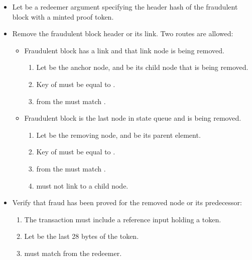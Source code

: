 \documentclass[../midgard.tex]{subfiles}
\begin{document}
\begin{description}
\begin{itemize}
        \item Let  be a redeemer argument specifying the header hash of the fraudulent block with a minted proof token.
        \item Remove the fraudulent block header or its link.
          Two routes are allowed:
          \begin{itemize}
            \item Fraudulent block has a link and that link node is being removed.
              \begin{enumerate}
                \item Let  be the anchor node, and  be its child node that is being removed.
                \item Key of  must be equal to .
                \item {} from the  must match .
              \end{enumerate}
            \item Fraudulent block is the last node in state queue and is being removed.
              \begin{enumerate}
                \item Let  be the removing node, and  be its parent element.
                \item Key of  must be equal to .
                \item {} from the  must match .
                \item {} must not link to a child node.
              \end{enumerate}
          \end{itemize}

        \item Verify that fraud has been proved for the removed node or its predecessor:
        \begin{enumerate}
            \item The transaction must include a reference input holding a  token.
            \item Let  be the last 28 bytes of the  token.
            \item {} must match  from the redeemer.
        \end{enumerate}
    \end{itemize}
\end{description}
\end{document}

